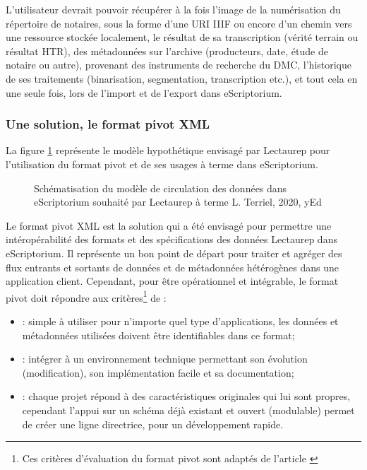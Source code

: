 L'utilisateur devrait pouvoir récupérer à la fois l'image de la numérisation du répertoire de notaires, sous la forme d'une URI IIIF ou encore d'un chemin vers une ressource stockée localement, le résultat de sa transcription (vérité terrain ou résultat HTR), des métadonnées sur l'archive (producteurs, date, étude de notaire ou autre), provenant des instruments de recherche du DMC, l'historique de ses traitements (binarisation, segmentation, transcription etc.), et tout cela en une seule fois, lors de l'import et de l'export dans eScriptorium.    

\subsubsection{Une solution, le format pivot XML}
La figure \ref{fig:modèle_métadonnées_vise_V4} représente le modèle hypothétique envisagé par Lectaurep pour l'utilisation du format pivot et de ses usages à terme dans eScriptorium. \\
\begin{figure}[h]
    \centering
    \centerline{}
    \caption{Schématisation du modèle de circulation des données dans eScriptorium souhaité par Lectaurep à terme  \textcopyright L. Terriel, 2020, yEd}
    \label{fig:modèle_métadonnées_vise_V4}
\end{figure}

Le format pivot XML est la solution qui a été envisagé pour permettre une intéropérabilité des formats et des spécifications des données Lectaurep dans eScriptorium. Il représente un bon point de départ pour traiter et agréger des flux entrants et sortants de données et de métadonnées hétérogènes dans une application client. Cependant, pour être opérationnel et intégrable, le format pivot doit répondre aux critères\footnote{Ces critères d'évaluation du format pivot sont adaptés de l'article \cite{crozat_standardisation_2006}} de : 

\begin{itemize}
    \item {} : simple à utiliser pour n'importe quel type d'applications, les données et métadonnées utilisées doivent être identifiables dans ce format;
    \item {} : intégrer à un environnement technique permettant son évolution (modification), son implémentation facile et sa documentation;
    \item {} : chaque projet répond à des caractéristiques originales qui lui sont propres, cependant l'appui sur un schéma déjà existant et ouvert (modulable) permet de créer une ligne directrice, pour un développement rapide.
\end{itemize}

